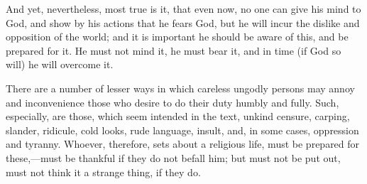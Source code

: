 And yet, nevertheless, most true is it, that even now, no one can
give his mind to God, and show by his actions that he fears God, but
he will incur the dislike and opposition of the world; and it is
important he should be aware of this, and be prepared for it. He must
not mind it, he must bear it, and in time (if God so will) he will
overcome it.

There are a number of lesser ways in which careless ungodly persons
may annoy and inconvenience those who desire to do their duty humbly
and fully. Such, especially, are those, which seem intended in the
text, unkind censure, carping, slander, ridicule, cold looks, rude
language, insult, and, in some cases, oppression and tyranny. Whoever,
therefore, sets about a religious life, must be prepared for these,—must
be thankful if they do not befall him; but must not be put out, must
not think it a strange thing, if they do.

